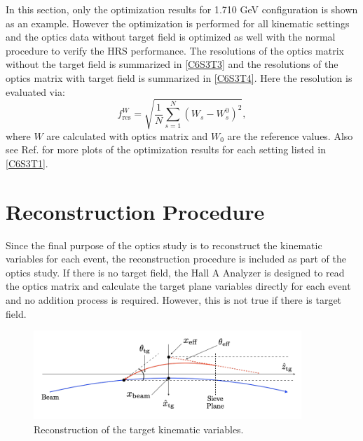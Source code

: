 In this section, only the optimization results for 1.710 GeV configuration is shown as an example. However the optimization is performed for all kinematic settings and the optics data without target field is optimized as well with the normal procedure to verify the HRS performance. The resolutions of the optics matrix without the target field is summarized in \cref{C6S3T3} and the resolutions of the optics matrix with target field is summarized in \cref{C6S3T4}. Here the resolution is evaluated via:
\begin{equation} \label{C6S3E6}
f_{\mathrm{res}}^W = \sqrt{\frac{1}{N}\sum_{s=1}^N(W_s-W_s^0)^2},
\end{equation}
where $W$ are calculated with optics matrix and $W_0$ are the reference values. Also see Ref. \cite{OPTICSWIKI} for more plots of the optimization results for each setting listed in \cref{C6S3T1}.

\section{Reconstruction Procedure}
\label{C6S4}

Since the final purpose of the optics study is to reconstruct the kinematic variables for each event, the reconstruction procedure is included as part of the optics study. If there is no target field, the Hall A Analyzer is designed to read the optics matrix and calculate the target plane variables directly for each event \cite{Hansen2015} and no addition process is required. However, this is not true if there is target field.

\begin{figure}[b!]
  \centering
  \includegraphics[width=0.9\textwidth]{figs/reconstruction.png}
  \caption[Reconstruction of the target kinematic variables.]{Reconstruction of the target kinematic variables. \label{C6S4F1}}
\end{figure}

